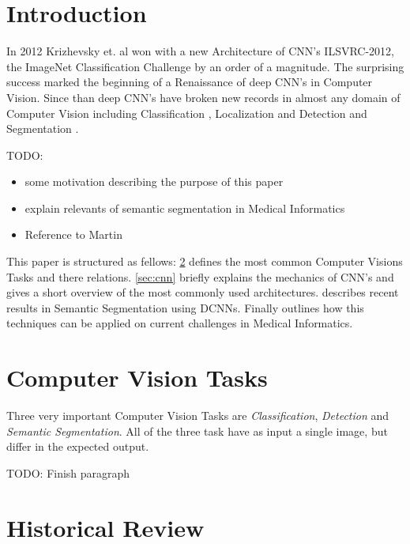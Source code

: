 \section{Introduction}\label{sec:introduction}

In 2012 Krizhevsky et. al \cite{AlexNet} won with a new Architecture of CNN's ILSVRC-2012, the ImageNet Classification Challenge by an order of a magnitude. The surprising success marked the beginning of a Renaissance of deep CNN's in Computer Vision. Since than deep CNN's have broken new records in almost any domain of Computer Vision including Classification \cite{AlexNet,VGG16,googLeNeT}, Localization and Detection \cite{RNN,overfeat} and Segmentation \cite{fcn,CRF1,googleSeg}.

TODO:
\begin{itemize}
\item some motivation  describing the purpose of this paper
\item explain relevants of semantic segmentation in Medical Informatics
\item Reference to Martin
\end{itemize}

This paper is structured as fellows: \cref{sec:tasks} defines the most common Computer Visions Tasks and there relations. \cref{sec:cnn} briefly explains the mechanics of CNN's and gives a short overview of the most commonly used architectures.  describes recent results in Semantic Segmentation using \Glspl{DCNN}. Finally  outlines how this techniques can be applied on current challenges in Medical Informatics.


\section{Computer Vision Tasks} \label{sec:tasks}

Three very important Computer Vision Tasks are \emph{Classification}, \emph{Detection} and \emph{Semantic Segmentation}. All of the three task have as input a single image, but differ in the expected output.

TODO: Finish paragraph

\iffalse

\section{Historical Review}\label{sec:review}



